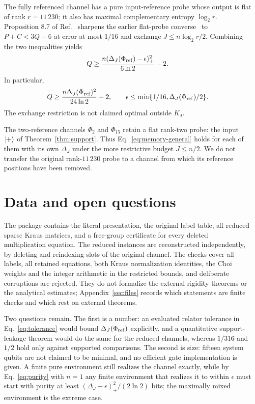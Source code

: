 \documentclass[11pt]{article}
\begin{document}
The fully referenced channel has a pure input-reference probe whose output is flat of
rank $r=11\,230$; it also has maximal complementary entropy $\log_2r$. Proposition 8.7
of Ref.~\cite{configuration} sharpens the earlier flat-probe converse~\cite[Theorem~5.8]{causal} to $P+C<3Q+6$ at
error at most $1/16$ and exchange $J\le n\log_2r/2$. Combining the two inequalities yields
\begin{equation}
 Q\ge\frac{n(\Delta_J(\Phi_{\mathrm{ref}})-\epsilon)_+^2}{6\ln2}-2.
 \label{eq:memory-general}
\end{equation}
In particular,
\begin{equation}
 Q\ge\frac{n\Delta_J(\Phi_{\mathrm{ref}})^2}{24\ln2}-2,
 \qquad \epsilon\le\min\{1/16,\Delta_J(\Phi_{\mathrm{ref}})/2\}.
 \label{eq:memory}
\end{equation}
The exchange restriction is not claimed optimal outside $K_d$.

The two-reference channels $\Phi_2$ and $\Phi_{15}$ retain a flat rank-two probe:
the input $\lvert +\rangle$ of Theorem~\ref{thm:support}. Thus
Eq.~\eqref{eq:memory-general} holds for each of them with its own $\Delta_J$ under the
more restrictive budget $J\le n/2$. We do not transfer the original rank-$11\,230$ probe
to a channel from which its reference positions have been removed.

\section{Data and open questions}

The package contains the literal presentation, the original label table, all reduced sparse
Kraus matrices, and a free-group certificate for every deleted multiplication equation. The
reduced instances are reconstructed independently, by deleting and reindexing slots of the
original channel. The checks cover all labels, all retained equations, both Kraus
normalization identities, the Choi weights and the integer arithmetic in the restricted
bounds, and deliberate corruptions are rejected. They do not formalize the external rigidity
theorems or the analytical estimates; Appendix~\ref{sec:files} records which statements are
finite checks and which rest on external theorems.

Two questions remain. The first is a number: an evaluated relator tolerance in
Eq.~\eqref{eq:tolerance} would bound $\Delta_J(\Phi_{\mathrm{ref}})$ explicitly, and a quantitative
support-leakage theorem would do the same for the reduced channels, whereas $1/316$ and $1/2$
hold only against supported comparisons. The second is size: fifteen system qubits are not
claimed to be minimal, and no efficient gate implementation is given. A finite pure environment
still realizes the channel exactly, while by Eq.~\eqref{eq:purity} with $n=1$ any finite
environment that realizes it to within $\epsilon$ must start with purity at least
$(\Delta_J-\epsilon)_+^2/(2\ln2)$ bits; the maximally mixed environment is the extreme case.
\end{document}
